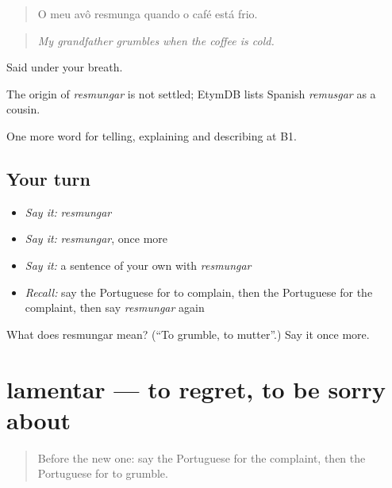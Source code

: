 \begin{quote}
O meu avô resmunga quando o café está frio.
\end{quote}

\begin{quote}
\emph{My grandfather grumbles when the coffee is cold.}
\end{quote}

Said under your breath.

\begin{cousinweb}
The origin of \emph{resmungar} is not settled; EtymDB lists Spanish \emph{remusgar} as a cousin.
\end{cousinweb}

\begin{grammarlens}[title={What you've built}]
One more word for telling, explaining and describing at B1.
\end{grammarlens}

\subsection*{Your turn}
\begin{itemize}
\raggedright
  \item \emph{Say it:} \emph{resmungar}
  \item \emph{Say it:} \emph{resmungar}, once more
  \item \emph{Say it:} a sentence of your own with \emph{resmungar}
  \item \emph{Recall:} say the Portuguese for to complain, then the Portuguese for the complaint, then say \emph{resmungar} again
\end{itemize}

\begin{tcolorbox}[breakable,colback=teal!4,colframe=teal!35!black,title={Before you move on}]
What does resmungar mean? (\textquotedblleft{}To grumble, to mutter\textquotedblright{}.) Say it once more.
\end{tcolorbox}
\section[lamentar]{lamentar — to regret, to be sorry about}

\label{lesson:PT-C434-lamentar}



\begin{quote}
Before the new one: say the Portuguese for the complaint, then the Portuguese for to grumble.
\end{quote}

